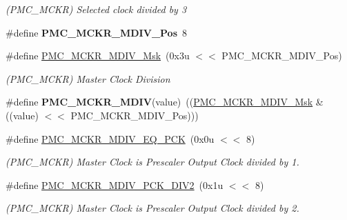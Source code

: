 \begin{DoxyCompactItemize}
\begin{DoxyCompactList}\small\item\em (P\+M\+C\+\_\+\+M\+C\+KR) Selected clock divided by 3 \end{DoxyCompactList}\item 
\mbox{\label{group__SAMS70__PMC_gac99ca480c961663d137afac11d10db6f}} 
\#define {\bfseries P\+M\+C\+\_\+\+M\+C\+K\+R\+\_\+\+M\+D\+I\+V\+\_\+\+Pos}~8
\item 
\mbox{\label{group__SAMS70__PMC_ga26ddee9ede0a35704832ea79e0390de8}} 
\#define \mbox{\hyperlink{group__SAMS70__PMC_ga26ddee9ede0a35704832ea79e0390de8}{P\+M\+C\+\_\+\+M\+C\+K\+R\+\_\+\+M\+D\+I\+V\+\_\+\+Msk}}~(0x3u $<$$<$ P\+M\+C\+\_\+\+M\+C\+K\+R\+\_\+\+M\+D\+I\+V\+\_\+\+Pos)
\begin{DoxyCompactList}\small\item\em (P\+M\+C\+\_\+\+M\+C\+KR) Master Clock Division \end{DoxyCompactList}\item 
\mbox{\label{group__SAMS70__PMC_gad85a14d31ec7430768b389e0dea941f7}} 
\#define {\bfseries P\+M\+C\+\_\+\+M\+C\+K\+R\+\_\+\+M\+D\+IV}(value)~((\mbox{\hyperlink{group__SAMV71__PMC_ga26ddee9ede0a35704832ea79e0390de8}{P\+M\+C\+\_\+\+M\+C\+K\+R\+\_\+\+M\+D\+I\+V\+\_\+\+Msk}} \& ((value) $<$$<$ P\+M\+C\+\_\+\+M\+C\+K\+R\+\_\+\+M\+D\+I\+V\+\_\+\+Pos)))
\item 
\mbox{\label{group__SAMS70__PMC_ga42b6cb019bd36310f8ed4838902914b1}} 
\#define \mbox{\hyperlink{group__SAMS70__PMC_ga42b6cb019bd36310f8ed4838902914b1}{P\+M\+C\+\_\+\+M\+C\+K\+R\+\_\+\+M\+D\+I\+V\+\_\+\+E\+Q\+\_\+\+P\+CK}}~(0x0u $<$$<$ 8)
\begin{DoxyCompactList}\small\item\em (P\+M\+C\+\_\+\+M\+C\+KR) Master Clock is Prescaler Output Clock divided by 1. \end{DoxyCompactList}\item 
\mbox{\label{group__SAMS70__PMC_gab35c4e98c54074212c4532403ab1b7d1}} 
\#define \mbox{\hyperlink{group__SAMS70__PMC_gab35c4e98c54074212c4532403ab1b7d1}{P\+M\+C\+\_\+\+M\+C\+K\+R\+\_\+\+M\+D\+I\+V\+\_\+\+P\+C\+K\+\_\+\+D\+I\+V2}}~(0x1u $<$$<$ 8)
\begin{DoxyCompactList}\small\item\em (P\+M\+C\+\_\+\+M\+C\+KR) Master Clock is Prescaler Output Clock divided by 2. \end{DoxyCompactList}\item 

\end{DoxyCompactItemize}

